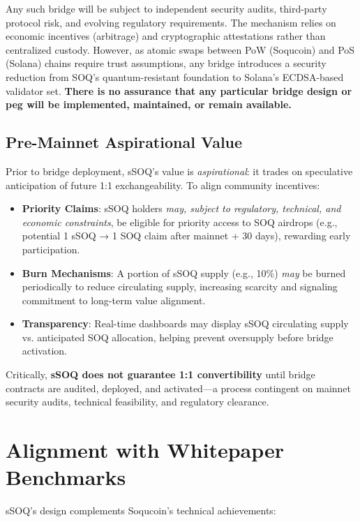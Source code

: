 \documentclass[10pt]{article}
\begin{document}
Any such bridge will be subject to independent security audits, third-party protocol risk, and evolving regulatory requirements. The mechanism relies on economic incentives (arbitrage) and cryptographic attestations rather than centralized custody. However, as atomic swaps between PoW (Soqucoin) and PoS (Solana) chains require trust assumptions, any bridge introduces a security reduction from SOQ's quantum-resistant foundation to Solana's ECDSA-based validator set. \textbf{There is no assurance that any particular bridge design or peg will be implemented, maintained, or remain available.}

\subsection{Pre-Mainnet Aspirational Value}

Prior to bridge deployment, sSOQ's value is \textit{aspirational}: it trades on speculative anticipation of future 1:1 exchangeability. To align community incentives:

\begin{itemize}
    \item \textbf{Priority Claims}: sSOQ holders \textit{may, subject to regulatory, technical, and economic constraints}, be eligible for priority access to SOQ airdrops (e.g., potential 1 sSOQ → 1 SOQ claim after mainnet + 30 days), rewarding early participation.
    \item \textbf{Burn Mechanisms}: A portion of sSOQ supply (e.g., 10\%) \textit{may} be burned periodically to reduce circulating supply, increasing scarcity and signaling commitment to long-term value alignment.
    \item \textbf{Transparency}: Real-time dashboards may display sSOQ circulating supply vs. anticipated SOQ allocation, helping prevent oversupply before bridge activation.
\end{itemize}

Critically, \textbf{sSOQ does not guarantee 1:1 convertibility} until bridge contracts are audited, deployed, and activated—a process contingent on mainnet security audits, technical feasibility, and regulatory clearance.

\section{Alignment with Whitepaper Benchmarks}

sSOQ's design complements Soqucoin's technical achievements:
\end{document}
